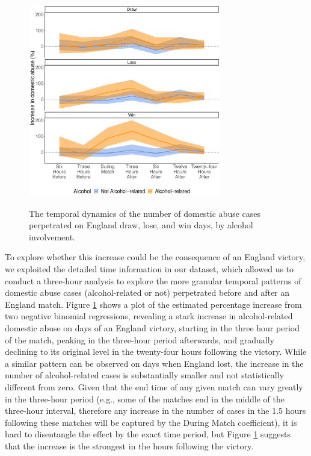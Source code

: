 \documentclass[12pt, a4paper]{article}
\begin{document}
 \begin{figure}[!htbp]
\centering
 \caption{The temporal dynamics of the number of domestic abuse cases perpetrated on England draw, lose, and win days, by alcohol involvement.}
\includegraphics[width=0.75\textwidth]{Threehours_newdata.pdf}
\label{fig:threehours}
\end{figure}

To explore whether this increase could be the consequence of an England victory, we exploited the detailed time information in our dataset, which allowed us to conduct a three-hour analysis to explore the more granular temporal patterns of domestic abuse cases (alcohol-related or not) perpetrated before and after an England match.  Figure \ref{fig:threehours} shows a plot of the estimated percentage increase from two negative binomial regressions, revealing a stark increase in alcohol-related domestic abuse on days of an England victory, starting in the three hour period of the match, peaking in the three-hour period afterwards, and gradually declining to its original level in the twenty-four hours following the victory. While a similar pattern can be observed on days when England lost, the increase in the number of alcohol-related cases is substantially smaller and not statistically different from zero. Given that the end time of any given match can vary greatly in the three-hour period (e.g., some of the matches end in the middle of the three-hour interval, therefore any increase in the number of cases in the 1.5 hours following these matches will be captured by the During Match coefficient), it is hard to disentangle the effect by the exact time period, but Figure \ref{fig:threehours} suggests that the increase is the strongest in the hours following the victory.
\end{document}
